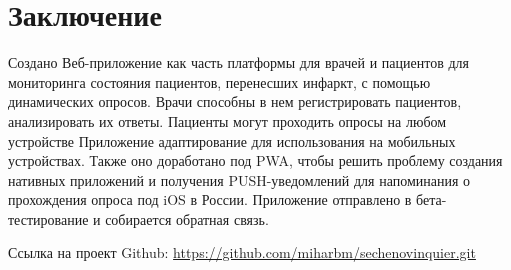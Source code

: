 \chapter*{Заключение}
\label{sec:3}

Создано Веб-приложение как часть платформы для врачей и пациентов для мониторинга состояния пациентов, перенесших инфаркт, с помощью динамических опросов.
Врачи способны в нем регистрировать пациентов, анализировать их ответы.
Пациенты могут проходить опросы на любом устройстве
Приложение адаптирование для использования на мобильных устройствах.
Также оно доработано под PWA, чтобы решить проблему создания нативных приложений и получения PUSH-уведомлений для напоминания о прохождения опроса под iOS в России.
Приложение отправлено в бета-тестирование и собирается обратная связь.

Ссылка на проект Github:
\url{https://github.com/miharbm/sechenovinquier.git}